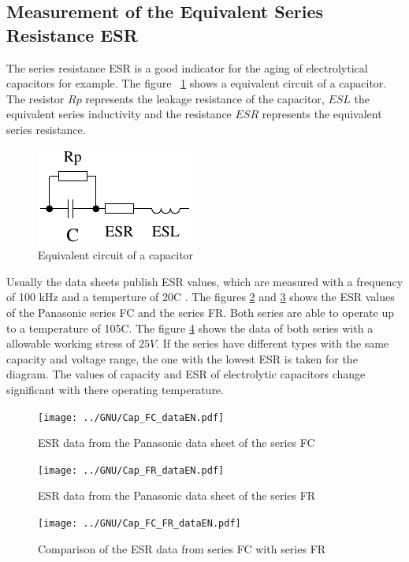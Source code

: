 \subsection{Measurement of the Equivalent Series Resistance ESR}
The series resistance ESR \cite{ESR} is a good indicator for the aging of electrolytical capacitors for example.
The figure ~\ref{fig:Cap_equiv} shows a equivalent circuit of a capacitor.
The resistor \(Rp\) represents the leakage resistance of the capacitor, \(ESL\) the equivalent series inductivity and
the resistance \(ESR\) represents the equivalent series resistance.

\begin{figure}[H]
  \centering
    \includegraphics[width=.3\textwidth]{../FIG/Cap_equiv.pdf}
  \caption{Equivalent circuit of a capacitor}
  \label{fig:Cap_equiv}
\end{figure}

Usually the data sheets publish ESR values, which are measured with a frequency of 100 kHz and a temperture 
of 20\textdegree C .
The figures \ref{fig:Cap_FC_data} and \ref{fig:Cap_FR_data} shows the ESR values of the Panasonic series FC and 
the  series FR.
Both series are able to operate up to a temperature of 105\textdegree C.
The figure \ref{fig:Cap_FC_FR_data} shows the data of both series with a allowable working stress of \(25V\).
If the series have different types with the same capacity and voltage range, the one with the lowest ESR is
taken for the diagram.
The values of capacity and ESR of electrolytic capacitors change significant with there operating temperature.

\begin{figure}[H]
  \centering
    \texttt{[image: ../GNU/Cap\_FC\_dataEN.pdf]}
  \caption{ESR data from the Panasonic data sheet of the series FC}
  \label{fig:Cap_FC_data}
\end{figure}

\begin{figure}[H]
  \centering
    \texttt{[image: ../GNU/Cap\_FR\_dataEN.pdf]}
  \caption{ESR data from the Panasonic data sheet of the series FR}
  \label{fig:Cap_FR_data}
\end{figure}

\begin{figure}[H]
  \centering
    \texttt{[image: ../GNU/Cap\_FC\_FR\_dataEN.pdf]}
  \caption{Comparison of the ESR data from series FC with series FR}
  \label{fig:Cap_FC_FR_data}
\end{figure}

